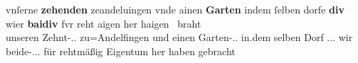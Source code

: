 \begin{exe}
\begin{xlist}

	\ex \label{ex:m+m_beidiu_5}
		\gll vnſerne \textbf{zehenden} zeandeluingen vnde
				ainen \textbf{Garten} indem ſelben dorfe \textelp{}
				\textbf{div} wier \textbf{baidiv} fvr reht aigen her
				haigen~ braht \\
			unseren Zehnt-\Acc.\Sg.\MascI{} zu=Andelfingen und einen
				Garten-\Acc.\Sg.\MascI{} in.dem selben Dorf {}
				\Rel.\Acc.\Pl.\NeutI{} wir beide-\Acc.\Pl.\NeutI.\St{} für
				rehtmäßig Eigentum her haben gebracht \\
		\begin{taggedline}{\parencites(Kl.~Heiligkreuztal, Kr.~Biberach, 1290)[\pno~1201~AB, 472.10--14]{cao2}}
		\trans {}
		\end{taggedline}
	\end{xlist}
\end{exe}

